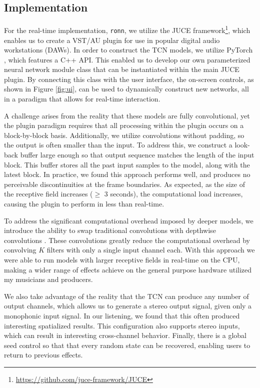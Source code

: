 \documentclass{article}
\begin{document}
\subsection{Implementation}
For the real-time implementation, \texttt{ronn}, we utilize the JUCE framework\footnote{\url{https://github.com/juce-framework/JUCE}},
which enables us to create a VST/AU plugin for use in popular digital audio workstations (DAWs).
In order to construct the TCN models, we utilize PyTorch \cite{pytorch}, which features a C++ API. 
This enabled us to develop our own parameterized neural network module class that can be instantiated within the main JUCE plugin.
By connecting this class with the user interface, the on-screen controls, as shown in Figure \ref{fig:ui},
can be used to dynamically construct new networks, all in a paradigm that allows for real-time interaction. 

A challenge arises from the reality that these models are fully convolutional,
yet the plugin paradigm requires that all processing within the plugin occurs on a block-by-block basis. 
Additionally, we utilize convolutions without padding, so the output is often smaller than the input. 
To address this, we construct a look-back buffer large enough so that output sequence matches the length of the input block. 
This buffer stores all the past input samples to the model, along with the latest block. 
In practice, we found this approach performs well, and produces no perceivable discontinuities at the frame boundaries. 
As expected, as the size of the receptive field increases ($\geq$ 3 seconds), the computational load increases, 
causing the plugin to perform in less than real-time.

To address the significant computational overhead imposed by deeper models, 
we introduce the ability to swap traditional convolutions with depthwise convolutions \cite{howard2017mobilenets}.
These convolutions greatly reduce the computational overhead by convolving $K$ filters with only a single input channel each. 
With this approach we were able to run models with larger receptive fields in real-time on the CPU,
making a wider range of effects achieve on the general purpose hardware utilized my musicians and producers. 

We also take advantage of the reality that the TCN can produce any number of output channels, 
which allows us to generate a stereo output signal, given only a monophonic input signal. 
In our listening, we found that this often produced interesting spatialized results. 
This configuration also supports stereo inputs, which can result in interesting cross-channel behavior. 
Finally, there is a global seed control so that that every random state can be recovered, enabling users to return to previous effects.
\end{document}
